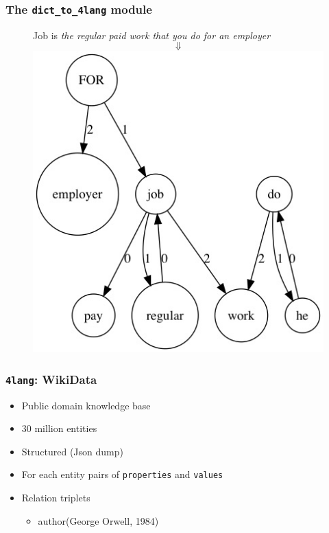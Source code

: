 \documentclass[bigger]{beamer}
\newcommand{\difl}{\texttt{dict\_to\_4lang}\xspace}
\newcommand{\fl}{\texttt{4lang}\xspace}
\begin{document}
\begin{frame}
    \frametitle{The \difl module \citep{Recski:2016d}}
    \pause \begin{figure}
    \centering
    \small
        Job is \textit{the regular paid work that you do for an employer}
        \pause \[\Downarrow\]
        \includegraphics[scale=0.4]{pics/job.jpg}
    \label{fig:job}
    \end{figure}
    
    \end{frame}
\begin{frame}
    \frametitle{\fl: WikiData}
\begin{itemize}
    \pause \item Public domain knowledge base
    \pause \item 30 million entities
    \pause \item Structured (Json dump)
    \pause \item For each entity pairs of \texttt{properties} and \texttt{values}
    \pause \item Relation triplets
        \begin{itemize}
            \pause \item author(George Orwell, 1984)
        \end{itemize}
\end{itemize}

\end{frame}
\end{document}
